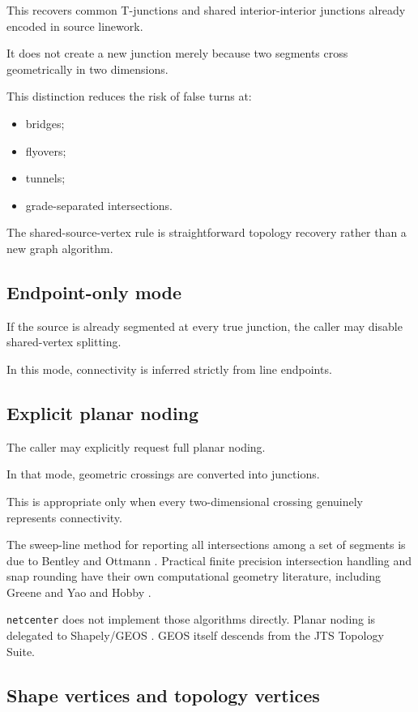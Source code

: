 \documentclass[11pt]{article}
\begin{document}
This recovers common T-junctions and shared interior-interior junctions already
encoded in source linework.

It does not create a new junction merely because two segments cross
geometrically in two dimensions.

This distinction reduces the risk of false turns at:

\begin{itemize}[leftmargin=1.5em]
\item bridges;
\item flyovers;
\item tunnels;
\item grade-separated intersections.
\end{itemize}

The shared-source-vertex rule is straightforward topology recovery rather than
a new graph algorithm.

\subsection{Endpoint-only mode}

If the source is already segmented at every true junction, the caller may
disable shared-vertex splitting.

In this mode, connectivity is inferred strictly from line endpoints.

\subsection{Explicit planar noding}

The caller may explicitly request full planar noding.

In that mode, geometric crossings are converted into junctions.

This is appropriate only when every two-dimensional crossing genuinely
represents connectivity.

The sweep-line method for reporting all intersections among a set of segments
is due to Bentley and Ottmann \cite{BentleyOttmann1979}. Practical finite
precision intersection handling and snap rounding have their own computational
geometry literature, including Greene and Yao \cite{GreeneYao1986} and Hobby
\cite{Hobby1999}.

\texttt{netcenter} does not implement those algorithms directly. Planar noding
is delegated to Shapely/GEOS \cite{ShapelyNode}. GEOS itself descends from the
JTS Topology Suite.

\subsection{Shape vertices and topology vertices}
\end{document}
